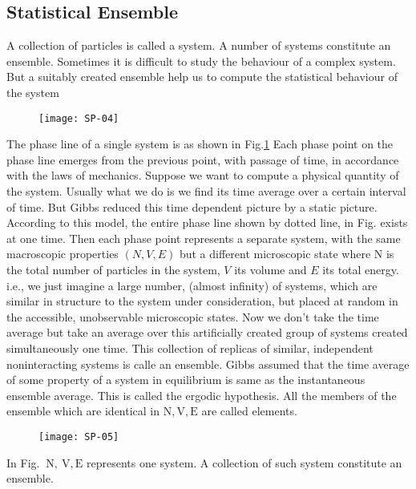\subsection{Statistical Ensemble}
A collection of particles is called a system. A number of systems constitute an ensemble. Sometimes it is difficult to study the behaviour of a complex system. But a suitably created ensemble help us to compute the statistical behaviour of the system
\begin{figure}[H]
	\centering
	\texttt{[image: SP-04]}
		\caption{}
	\label{SP-01}
\end{figure}
The phase line of a single system is as shown in Fig.\ref{SP-01}  Each phase point on the phase line emerges from the previous point, with passage of time, in accordance with the laws of mechanics. Suppose we want to compute a physical quantity of the system. Usually what we do is we find its time average over a certain interval of time. But Gibbs reduced this time dependent picture by a static picture. According to this model, the entire phase line shown by dotted line, in Fig. exists at one time. Then each phase point represents a separate system, with the same macroscopic properties $(N, V, E)$ but a different microscopic state where $\mathrm{N}$ is the total number of particles in the system, $V$ its volume and $E$ its total energy. i.e., we just imagine a large number, (almost infinity) of systems, which are similar in structure to the system under consideration, but placed at random in the accessible, unobservable microscopic states. Now we don't take the time average but take an average over this artificially created group of systems created simultaneously one time. This collection of replicas of similar, independent noninteracting systems is calle an ensemble. Gibbs assumed that the time average of some property of a system in equilibrium is same as the instantaneous ensemble average. This is called the ergodic hypothesis.
All the members of the ensemble which are identical in $\mathrm{N}, \mathrm{V}, \mathrm{E}$ are called elements.
\begin{figure}[H]
	\centering
	\texttt{[image: SP-05]}
\end{figure}
In Fig. $\mathrm{~N}, \mathrm{~V}, \mathrm{E}$ represents one system. A collection of such system constitute an ensemble.
